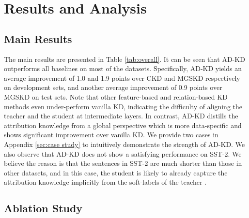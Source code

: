 \documentclass[11pt]{article}
\begin{document}
\section{Results and Analysis}
\subsection{Main Results}
The main results are presented in Table \ref{tab:overall}. It can be seen that AD-KD outperforms all baselines on most of the datasets. Specifically, AD-KD yields an average improvement of 1.0 and 1.9 points over CKD and MGSKD respectively on development sets, and another average improvement of 0.9 points over MGSKD on test sets. Note that other feature-based and relation-based KD methods even under-perform vanilla KD, indicating the difficulty of aligning the teacher and the student at intermediate layers. In contrast, AD-KD distills the attribution knowledge from a global perspective which is more data-specific and shows significant improvement over vanilla KD. We provide two cases in Appendix \ref{sec:case study} to intuitively demonstrate the strength of AD-KD. We also observe that AD-KD does not show a satisfying performance on SST-2. We believe the reason is that the sentences in SST-2 are much shorter than those in other datasets, and in this case, the student is likely to already capture the attribution knowledge implicitly from the soft-labels of the teacher \citep{zhang2022quantifying}.

\subsection{Ablation Study}
\end{document}
